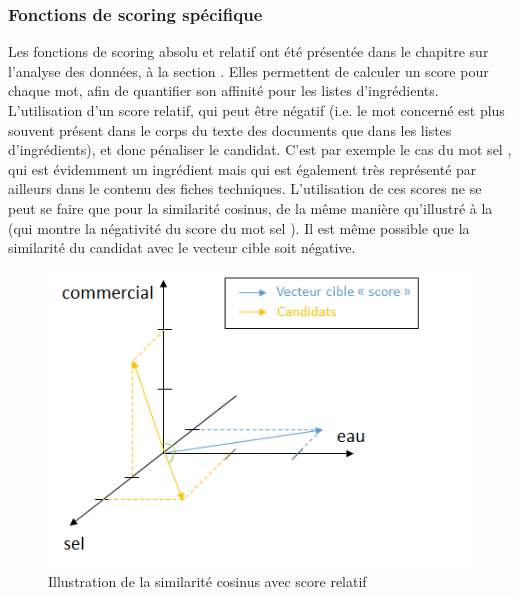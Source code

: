             \subsubsection{Fonctions de scoring spécifique}

            Les fonctions de scoring \og absolu \fg et \og relatif \fg ont été présentée dans le chapitre sur l'analyse des données, à la section .
            Elles permettent de calculer un score pour chaque mot, afin de quantifier son \og affinité \fg pour les listes d'ingrédients.
            L'utilisation d'un score relatif, qui peut être négatif (i.e. le mot concerné est plus souvent présent dans le corps du texte des documents que dans les listes d'ingrédients), et donc pénaliser le candidat. 
            C'est par exemple le cas du mot \og sel \fg, qui est évidemment un ingrédient mais qui est également très représenté par ailleurs dans le contenu des fiches techniques.
            L'utilisation de ces scores ne se peut se faire que pour la similarité cosinus, de la même manière qu'illustré à la  (qui montre la \og négativité \fg du score du mot \og sel \fg).
            Il est même possible que la similarité du candidat avec le vecteur cible soit négative.

            \begin{figure}[htbp]
                \begin{center}
                \includegraphics[width=0.9\linewidth]{img/similarite_score.png}
                \end{center}
                \caption{Illustration de la similarité cosinus avec score relatif}
                \label{fig:similarite_score}
            \end{figure}


